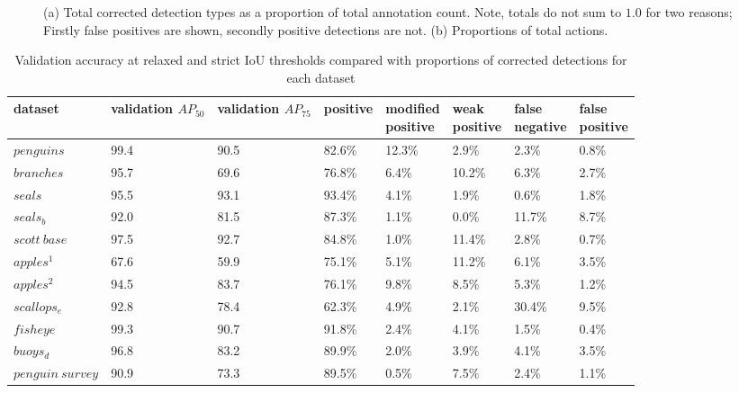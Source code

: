 \begin{figure}[ht!]
\caption {(a) Total corrected detection types as a proportion of total annotation count. Note, totals do not sum to $1.0$ for two reasons; Firstly false positives are shown, secondly positive detections are not. (b) Proportions of total actions. }
\label{fig:actions_dataset}
\end{figure}

\begin{table}[h!]
\caption{Validation accuracy at relaxed and strict IoU thresholds compared with proportions of corrected detections for each dataset}
\label{tabl:validation_corrections}
\begin{tabular}{llllllll}
dataset           & \shortstack{validation \\ $AP_{50}$} & \shortstack{validation  \\ $AP_{75}$} & positive & \shortstack{modified\\ positive} & \shortstack{weak\\ positive} & \shortstack{false \\ negative} & \shortstack{false \\ positive} \\
\toprule
$penguins$        & 99.4      & 90.5      & 82.6\%   & 12.3\%            & 2.9\%         & 2.3\%          & 0.8\%          \\
$branches$        & 95.7      & 69.6      & 76.8\%   & 6.4\%             & 10.2\%        & 6.3\%          & 2.7\%          \\
$seals$           & 95.5      & 93.1      & 93.4\%   & 4.1\%             & 1.9\%         & 0.6\%          & 1.8\%          \\
$seals_b$         & 92.0      & 81.5      & 87.3\%   & 1.1\%             & 0.0\%         & 11.7\%         & 8.7\%          \\
$scott\:base$     & 97.5      & 92.7      & 84.8\%   & 1.0\%             & 11.4\%        & 2.8\%          & 0.7\%          \\
$apples^1$        & 67.6      & 59.9      & 75.1\%   & 5.1\%             & 11.2\%        & 6.1\%          & 3.5\%          \\
$apples^2$        & 94.5      & 83.7      & 76.1\%   & 9.8\%             & 8.5\%         & 5.3\%          & 1.2\%          \\
$scallops_e$      & 92.8      & 78.4      & 62.3\%   & 4.9\%             & 2.1\%         & 30.4\%         & 9.5\%          \\
$fisheye$         & 99.3      & 90.7      & 91.8\%   & 2.4\%             & 4.1\%         & 1.5\%          & 0.4\%          \\
$buoys_d$         & 96.8      & 83.2      & 89.9\%   & 2.0\%             & 3.9\%         & 4.1\%          & 3.5\%          \\
$penguin\:survey$ & 90.9      & 73.3      & 89.5\%   & 0.5\%             & 7.5\%         & 2.4\%          & 1.1\%        \\
\bottomrule
\end{tabular}
\end{table}

